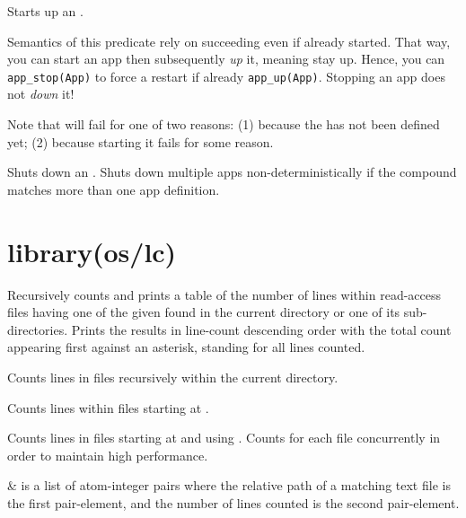 \begin{description}
Starts up an .

Semantics of this predicate rely on  succeeding even if
already started. That way, you can start an app then subsequently
\textit{up} it, meaning stay up. Hence, you can \verb$app_stop(App)$ to force a
restart if already \verb$app_up(App)$. Stopping an app does not \textit{down} it!

Note that  will fail for one of two reasons: (1) because
the  has not been defined yet; (2) because starting it fails for
some reason.

Shuts down an . Shuts down multiple apps non-deterministically if
the  compound matches more than one app definition.
\end{description}

\chapter{library(os/lc)}\label{sec:lc}

\begin{description}
Recursively counts and prints a table of the number of lines within
read-access files having one of the given  found in the
current directory or one of its sub-directories. Prints the results
in line-count descending order with the total count appearing first
against an asterisk, standing for all lines counted.

Counts lines in files recursively within the current directory.

Counts lines within files starting at .

Counts lines in files starting at  and using .
Counts for each file concurrently in order to maintain high
performance.

\begin{arguments}
 & is a list of atom-integer pairs where the relative path
of a matching text file is the first pair-element, and the number of
lines counted is the second pair-element. \\
\end{arguments}
\end{description}

